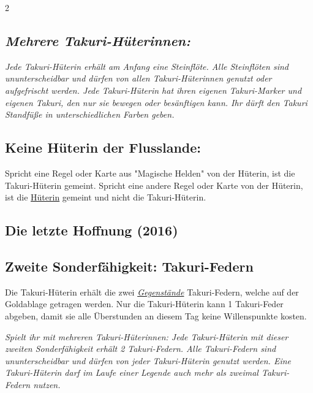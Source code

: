 \documentclass[10pt, a4paper, oneside]{book}
\newcommand{\fan}[1]{\textit{#1}}
\begin{document}
\begin{multicols*}{2}
\begin{nobgcolor}
\subsection{\fan{Mehrere Takuri-Hüterinnen:}}

\fan{Jede Takuri-Hüterin erhält am Anfang eine Steinflöte. Alle Steinflöten sind ununterscheidbar und dürfen von allen Takuri-Hüterinnen genutzt oder aufgefrischt werden. Jede Takuri-Hüterin hat ihren eigenen Takuri-Marker und eigenen Takuri, den nur sie bewegen oder besänftigen kann. Ihr dürft den Takuri Standfüße in unterschiedlichen Farben geben.}




\subsection{Keine Hüterin der Flusslande:}

Spricht eine Regel oder Karte aus "Magische Helden" von der Hüterin, ist die Takuri-Hüterin gemeint. Spricht eine andere Regel oder Karte von der Hüterin, ist die \hyperref[Hüterin]{Hüterin} gemeint und nicht die Takuri-Hüterin.




\end{nobgcolor}




\begin{bgcolor}
\section{Die letzte Hoffnung (2016)}



\subsection{Zweite Sonderfähigkeit: Takuri-Federn}

Die Takuri-Hüterin erhält die zwei \hyperref[Gegenstände und Sonderplättchen]{\fan{Gegenstände}} Takuri-Federn, welche auf der Goldablage getragen werden. Nur die Takuri-Hüterin kann 1 Takuri-Feder abgeben, damit sie alle Überstunden an diesem Tag keine Willenspunkte kosten.
\supercite{MH11:Heldenkarte_Takuri-Hüterin}

\fan{Spielt ihr mit mehreren Takuri-Hüterinnen: Jede Takuri-Hüterin mit dieser zweiten Sonderfähigkeit erhält 2 Takuri-Federn. Alle Takuri-Federn sind ununterscheidbar und dürfen von jeder Takuri-Hüterin genutzt werden. Eine Takuri-Hüterin darf im Laufe einer Legende auch mehr als zweimal Takuri-Federn nutzen.}



\end{bgcolor}
\end{multicols*}
\end{document}
